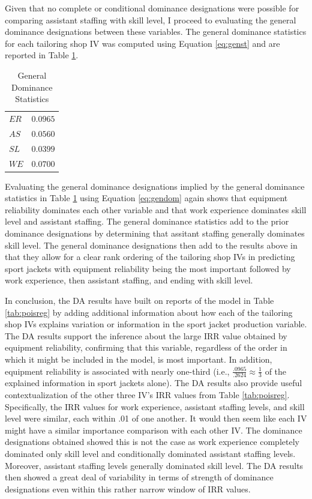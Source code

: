 \documentclass[doc]{apa7}
\begin{document}
	Given that no complete or conditional dominance designations were possible for comparing assistant staffing with skill level, I proceed to evaluating the general dominance designations between these variables. 
	The general dominance statistics for each tailoring shop IV was computed using Equation \ref{eq:genst} and are reported in Table \ref{tab:gen}.
	
	\begin{table}[h!]
		\centering
		\caption{\centering General Dominance Statistics}
		\begin{tabular}{l|r}
			\hline %
			$ER$ & $0.0965$ \\ 
			$AS$ & $0.0560$ \\ 
			$SL$ & $0.0399$ \\ 
			$WE$ & $0.0700$ \\ 
			\hline %
		\end{tabular}
		\label{tab:gen}
	\end{table}

	Evaluating the general dominance designations implied by the general dominance statistics in Table \ref{tab:gen} using Equation \ref{eq:gendom} again shows that equipment reliability dominates each other variable and that work experience dominates skill level and assistant staffing. 
	The general dominance statistics add to the prior dominance designations by determining that assitant staffing generally dominates skill level.
	The general dominance designations then add to the results above in that they allow for a clear rank ordering of the tailoring shop IVs in predicting sport jackets with equipment reliability being the most important followed by work experience, then assistant staffing, and ending with skill level.
	
	In conclusion, the DA results have built on reports of the model in Table \ref{tab:poisreg} by adding additional information about how each of the tailoring shop IVs explains variation or information in the sport jacket production variable. 
	The DA results support the inference about the large IRR value obtained by equipment reliability, confirming that this variable, regardless of the order in which it might be included in the model, is most important. 
	In addition, equipment reliability is associated with nearly one-third (i.e., $\frac{.0965}{.2624} \approx \frac{1}{3}$ of the explained information in sport jackets alone).
	The DA results also provide useful contextualization of the other three IV's IRR values from Table \ref{tab:poisreg}.
	Specifically, the IRR values for work experience, assistant staffing levels, and skill level were similar, each within .01 of one another. 
	It would then seem like each IV might have a similar importance comparison with each other IV.
	The dominance designations obtained showed this is not the case as work experience completely dominated only skill level and conditionally dominated assistant staffing levels. 
	Moreover, assistant staffing levels generally dominated skill level.
	The DA results then showed a great deal of variability in terms of strength of dominance designations even within this rather narrow window of IRR values.
	
\end{document}
